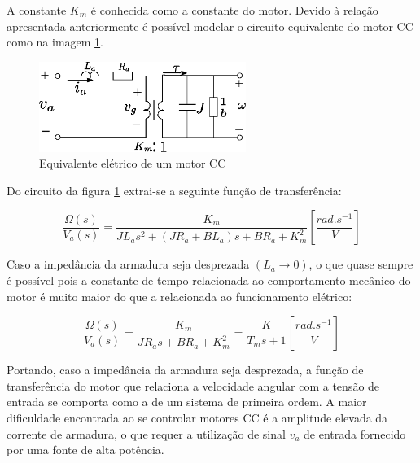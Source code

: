 A constante $K_{m}$ é conhecida como a constante do motor. Devido à relação apresentada anteriormente é possível modelar o circuito equivalente do motor CC como na imagem \ref{fig:eq_eletrico_motorcc}.
\begin{figure}[H]
    \centering
    \includegraphics[width=0.6\textwidth]{figuras/ilustracoes/circuito_equivalente_motor_cc.eps}
    \caption{Equivalente elétrico de um motor CC}
    \label{fig:eq_eletrico_motorcc}
\end{figure}

Do circuito da figura \ref{fig:eq_eletrico_motorcc} extrai-se a seguinte função de transferência:

\begin{equation*}
    \frac{\Omega(s)}{V_a(s)} = \frac{K_m}{JL_{a}s^2 + \left(JR_a + BL_a \right)s + BR_a + K_{m}^2} \left[\frac{ rad.s^{-1}}{V}  \right]
\end{equation*}

Caso a impedância da armadura seja desprezada $(L_a \xrightarrow{} 0)$, o que quase sempre é possível pois a constante de tempo relacionada ao comportamento mecânico do motor é muito maior do que a relacionada ao funcionamento elétrico:

\begin{equation}
    \frac{\Omega(s)}{V_{a}(s)} = \frac{K_m}{JR_{a}s + BR_{a} + K_{m}^2} = \frac{K}{T_{m}s + 1} \left[\frac{ rad.s^{-1}}{V}  \right]
    \label{eq:motor_transf_func}
\end{equation}

Portando, caso a impedância da armadura seja desprezada, a função de transferência do motor que relaciona a velocidade angular com a tensão de entrada se comporta como a de um sistema de primeira ordem. A maior dificuldade encontrada ao se controlar motores CC é a amplitude elevada da corrente de armadura, o que requer a utilização de sinal $v_a$ de entrada fornecido por uma fonte de alta potência.